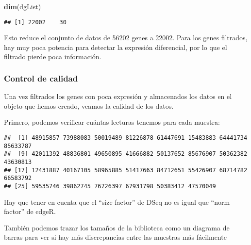 \documentclass[
]{article}
\newenvironment{Shaded}{\begin{snugshade}}{\end{snugshade}}
\newcommand{\DataTypeTok}[1]{\textcolor[rgb]{0.13,0.29,0.53}{#1}}
\newcommand{\DecValTok}[1]{\textcolor[rgb]{0.00,0.00,0.81}{#1}}
\newcommand{\FloatTok}[1]{\textcolor[rgb]{0.00,0.00,0.81}{#1}}
\newcommand{\KeywordTok}[1]{\textcolor[rgb]{0.13,0.29,0.53}{\textbf{#1}}}
\newcommand{\NormalTok}[1]{#1}
\newcommand{\OperatorTok}[1]{\textcolor[rgb]{0.81,0.36,0.00}{\textbf{#1}}}
\begin{document}
\begin{Shaded}
\begin{Highlighting}[]
\KeywordTok{dim}\NormalTok{(dgList)}
\end{Highlighting}
\end{Shaded}

\begin{verbatim}
## [1] 22002    30
\end{verbatim}

Esto reduce el conjunto de datos de 56202 genes a 22002. Para los genes
filtrados, hay muy poca potencia para detectar la expresión diferencial,
por lo que el filtrado pierde poca información.

\hypertarget{control-de-calidad}{%
\subsubsection{Control de calidad}\label{control-de-calidad}}

Una vez filtrados los genes con poca expresión y almacenados los datos
en el objeto que hemos creado, veamos la calidad de los datos.

Primero, podemos verificar cuántas lecturas tenemos para cada muestra:

\begin{Shaded}
\end{Shaded}

\begin{verbatim}
##  [1] 48915857 73988083 50019489 81226878 61447691 15483883 64441734 85633787
##  [9] 42011392 48836801 49650895 41666882 50137652 85676907 50362382 43630813
## [17] 12431887 40167105 58965885 51417663 84712651 55426907 68714782 66583792
## [25] 59535746 39862745 76726397 67931798 50383412 47570049
\end{verbatim}

Hay que tener en cuenta que el ``size factor'' de DSeq no es igual que
``norm factor'' de edgeR.

También podemos trazar los tamaños de la biblioteca como un diagrama de
barras para ver si hay más discrepancias entre las muestras más
fácilmente

\begin{Shaded}
\end{Shaded}
\end{document}
